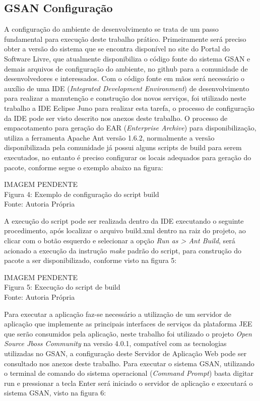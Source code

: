 	
\subsection{GSAN Configuração}
A configuração do ambiente de desenvolvimento se trata de um passo fundamental para execução deste trabalho prático. Primeiramente será preciso obter a versão do sistema que se encontra disponível no site do Portal do Software Livre, que atualmente disponibiliza o código fonte do sistema GSAN e demais arquivos de configuração do ambiente, no github para a comunidade de desenvolvedores e interessados.  Com o código fonte em mãos será necessário o auxílio de uma IDE (\textit{Integrated Development Environment}) de desenvolvimento para realizar a manutenção e construção dos novos serviços, foi utilizado neste trabalho a IDE Eclipse Juno para realizar esta tarefa, o processo de configuração da IDE pode ser visto descrito nos anexos deste trabalho.
O processo de empacotamento para geração do EAR (\textit{Enterprise Archive}) para disponibilização, utiliza a ferramenta Apache Ant versão 1.6.2, normalmente a versão disponibilizada pela comunidade já possui alguns scripts de build para serem executados, no entanto é preciso configurar os locais adequados para geração do pacote, conforme segue o exemplo abaixo na figura:



\begin{center}
	IMAGEM PENDENTE \\
	Figura 4: Exemplo de configuração do script build \\
	Fonte: Autoria Própria
\end{center}
	
A execução do script pode ser realizada dentro da IDE executando o seguinte procedimento, após localizar o arquivo build.xml dentro na raiz do projeto, ao clicar com o botão esquerdo e selecionar a opção \textit{Run as > Ant Build}, será acionado a execução da instrução \textit{make} padrão do script, para construção do pacote a ser disponibilizado, conforme visto na figura 5:	
	

\begin{center}
	IMAGEM PENDENTE \\
	Figura 5: Execução do script de build  \\
	Fonte: Autoria Própria	
\end{center}	

Para executar a aplicação faz-se necessário a utilização de um servidor de aplicação que implemente as principais interfaces de serviços da plataforma JEE que serão consumidos pela aplicação, neste trabalho foi utilizado o projeto \textit{Open Source Jboss Community} na versão 4.0.1, compatível com as tecnologias utilizadas no GSAN, a configuração deste Servidor de Aplicação Web pode ser consultado nos anexos deste trabalho.
Para executar o sistema GSAN, utilizando o terminal de comando do sistema operacional (\textit{Command Prompt}) basta digitar run e pressionar a tecla Enter será iniciado o servidor de aplicação e executará o sistema GSAN, visto na figura 6:


